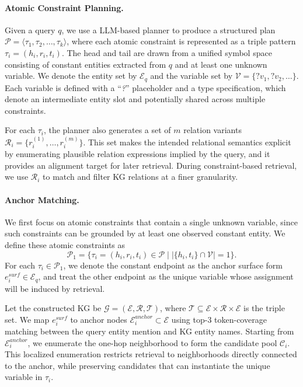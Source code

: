 \documentclass{article}
\theoremstyle{plain}
\theoremstyle{definition}
\theoremstyle{remark}
\begin{document}
\paragraph{Atomic Constraint Planning.}
Given a query $q$, we use a LLM-based planner to produce a structured plan
$\mathcal{P}=\langle \tau_1,\tau_2,\ldots,\tau_k\rangle$,
where each atomic constraint is represented as a triple pattern
$\tau_i=(h_i,r_i,t_i)$.
The head and tail are drawn from a unified symbol space consisting of constant entities extracted from $q$ and at least one unknown variable.
We denote the entity set by $\mathcal{E}_q$ and the variable set by $\mathcal{V}=\{?v_1,?v_2,\ldots\}$. Each variable is defined with a “\textit{?}” placeholder and a type specification, which denote an intermediate entity slot and potentially shared across multiple constraints.

For each $\tau_i$, the planner also generates a set of $m$ relation variants
$\mathcal{R}_i=\{r_i^{(1)},\ldots,r_i^{(m)}\}$.
This set makes the intended relational semantics explicit by enumerating plausible relation expressions implied by the query, and it provides an alignment target for later retrieval.
During constraint-based retrieval, we use $\mathcal{R}_i$ to match and filter KG relations at a finer granularity.

\paragraph{Anchor Matching.}
We first focus on atomic constraints that contain a single unknown variable, since such constraints can be grounded by at least one observed constant entity.
We define these atomic constraints as
\begin{equation}
\mathcal{P}_1 = \{\tau_i=(h_i,r_i,t_i)\in\mathcal{P}\mid |\{h_i,t_i\}\cap\mathcal{V}|=1\}.
\end{equation}
For each $\tau_i\in\mathcal{P}_1$, we denote the constant endpoint as the anchor surface form $e_i^{surf}\in\mathcal{E}_q$,
and treat the other endpoint as the unique variable whose assignment will be induced by retrieval.

Let the constructed KG be $\mathcal{G}=(\mathcal{E},\mathcal{R},\mathcal{T})$,
where $\mathcal{T}\subseteq\mathcal{E}\times\mathcal{R}\times\mathcal{E}$ is the triple set.
We map $e_i^{surf}$ to anchor nodes \(\mathcal{E}^{anchor}_i \subset \mathcal{E}\) using top-3 token-coverage matching between the query entity mention and KG entity names. 
Starting from $\mathcal{E}^{anchor}_i$, we enumerate the one-hop neighborhood to form the candidate pool $\mathcal{C}_i$.
This localized enumeration restricts retrieval to neighborhoods directly connected to the anchor, while preserving candidates that can instantiate the unique variable in $\tau_i$.
\end{document}
